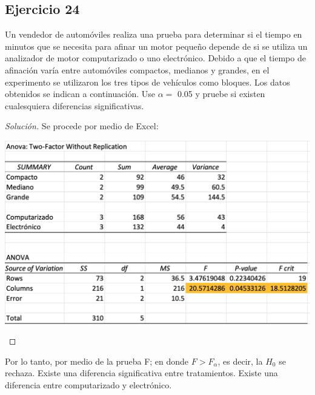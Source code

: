 \documentclass[a4paper,12pt]{article}
\newenvironment{solution}
  {\renewcommand\qedsymbol{$\blacksquare$}\begin{proof}[Solución]}
  {\end{proof}}
\begin{document}
\subsection{Ejercicio 24}
Un vendedor de automóviles realiza una prueba para determinar si el tiempo en minutos que se necesita para afinar un motor pequeño depende de si se utiliza un analizador de motor computarizado o uno electrónico. Debido a que el tiempo de afinación varía entre automóviles compactos, medianos y grandes, en el experimento se utilizaron los tres tipos de vehículos como bloques. Los datos obtenidos se indican a continuación. Use $\alpha =$ 0.05 y pruebe si existen cualesquiera diferencias significativas.

\begin{solution}
Se procede por medio de Excel: 
\begin{center}
    \includegraphics[scale=0.3]{Imagenes/24.png}
\end{center}
\end{solution}

Por lo tanto, por medio de la prueba F; en donde $F>F_\alpha$, es decir, la $H_0$ se rechaza. Existe una diferencia significativa entre tratamientos. Existe una diferencia entre computarizado y electrónico. 
\end{document}
